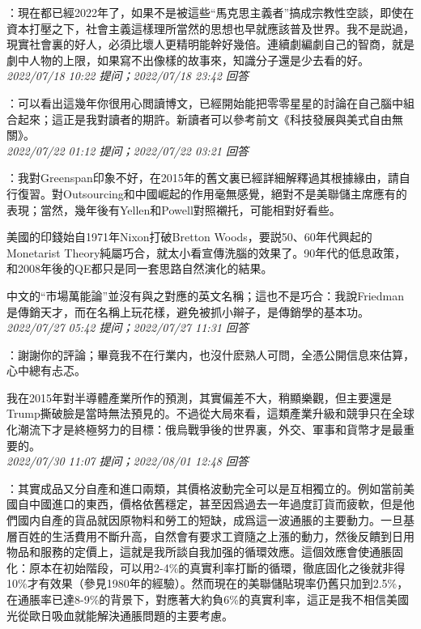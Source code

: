 \documentclass[twocolumn]{ctexart}
\begin{document}
：現在都已經2022年了，如果不是被這些“馬克思主義者”搞成宗教性空談，即使在資本打壓之下，社會主義這樣理所當然的思想也早就應該普及世界。我不是説過，現實社會裏的好人，必須比壞人更精明能幹好幾倍。連續劇編劇自己的智商，就是劇中人物的上限，如果寫不出像樣的故事來，知識分子還是少去看的好。
\\

\textit{\hfill\noindent\small 2022/07/18 10:22 提问；2022/07/18 23:42 回答}

：可以看出這幾年你很用心閲讀博文，已經開始能把零零星星的討論在自己腦中組合起來；這正是我對讀者的期許。新讀者可以參考前文《科技發展與美式自由無關》。
\\

\textit{\hfill\noindent\small 2022/07/22 01:12 提问；2022/07/22 03:21 回答}

：我對Greenspan印象不好，在2015年的舊文裏已經詳細解釋過其根據緣由，請自行復習。對Outsourcing和中國崛起的作用毫無感覺，絕對不是美聯儲主席應有的表現；當然，幾年後有Yellen和Powell對照襯托，可能相對好看些。

美國的印錢始自1971年Nixon打破Bretton Woods，要説50、60年代興起的Monetarist Theory純屬巧合，就太小看宣傳洗腦的效果了。90年代的低息政策，和2008年後的QE都只是同一套思路自然演化的結果。

中文的“市場萬能論”並沒有與之對應的英文名稱；這也不是巧合：我說Friedman是傳銷天才，而在名稱上玩花樣，避免被抓小辮子，是傳銷學的基本功。
\\

\textit{\hfill\noindent\small 2022/07/27 05:42 提问；2022/07/27 11:31 回答}

：謝謝你的評論；畢竟我不在行業内，也沒什麽熟人可問，全憑公開信息來估算，心中總有忐忑。

我在2015年對半導體產業所作的預測，其實偏差不大，稍顯樂觀，但主要還是Trump撕破臉是當時無法預見的。不過從大局來看，這類產業升級和競爭只在全球化潮流下才是終極努力的目標：俄烏戰爭後的世界裏，外交、軍事和貨幣才是最重要的。
\\

\textit{\hfill\noindent\small 2022/07/30 11:07 提问；2022/08/01 12:48 回答}

：其實成品又分自產和進口兩類，其價格波動完全可以是互相獨立的。例如當前美國自中國進口的東西，價格依舊穩定，甚至因爲過去一年過度訂貨而疲軟，但是他們國内自產的貨品就因原物料和勞工的短缺，成爲這一波通脹的主要動力。一旦基層百姓的生活費用不斷升高，自然會有要求工資隨之上漲的動力，然後反饋到日用物品和服務的定價上，這就是我所談自我加强的循環效應。這個效應會使通脹固化：原本在初始階段，可以用2-4\%的真實利率打斷的循環，徹底固化之後就非得10\%才有效果（參見1980年的經驗）。然而現在的美聯儲貼現率仍舊只加到2.5\%，在通脹率已達8-9\%的背景下，對應著大約負6\%的真實利率，這正是我不相信美國光從歐日吸血就能解決通脹問題的主要考慮。
\end{document}
